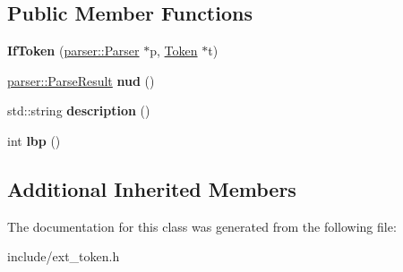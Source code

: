 \subsection*{Public Member Functions}
\begin{DoxyCompactItemize}
\item 
{\bfseries If\+Token} (\hyperlink{classfcal_1_1parser_1_1Parser}{parser\+::\+Parser} $\ast$p, \hyperlink{classfcal_1_1scanner_1_1Token}{Token} $\ast$t)\hypertarget{classfcal_1_1scanner_1_1IfToken_ab62190e056e132f94f99077fd48049fc}{}\label{classfcal_1_1scanner_1_1IfToken_ab62190e056e132f94f99077fd48049fc}

\item 
\hyperlink{classfcal_1_1parser_1_1ParseResult}{parser\+::\+Parse\+Result} {\bfseries nud} ()\hypertarget{classfcal_1_1scanner_1_1IfToken_a66e666cbade5d1be24d0639dad88a594}{}\label{classfcal_1_1scanner_1_1IfToken_a66e666cbade5d1be24d0639dad88a594}

\item 
std\+::string {\bfseries description} ()\hypertarget{classfcal_1_1scanner_1_1IfToken_a76c60330e996fab7bbcaaab1f825d62c}{}\label{classfcal_1_1scanner_1_1IfToken_a76c60330e996fab7bbcaaab1f825d62c}

\item 
int {\bfseries lbp} ()\hypertarget{classfcal_1_1scanner_1_1IfToken_a8ef9ce247acf496793ef3cecafea1c42}{}\label{classfcal_1_1scanner_1_1IfToken_a8ef9ce247acf496793ef3cecafea1c42}

\end{DoxyCompactItemize}
\subsection*{Additional Inherited Members}


The documentation for this class was generated from the following file\+:\begin{DoxyCompactItemize}
\item 
include/ext\+\_\+token.\+h\end{DoxyCompactItemize}
